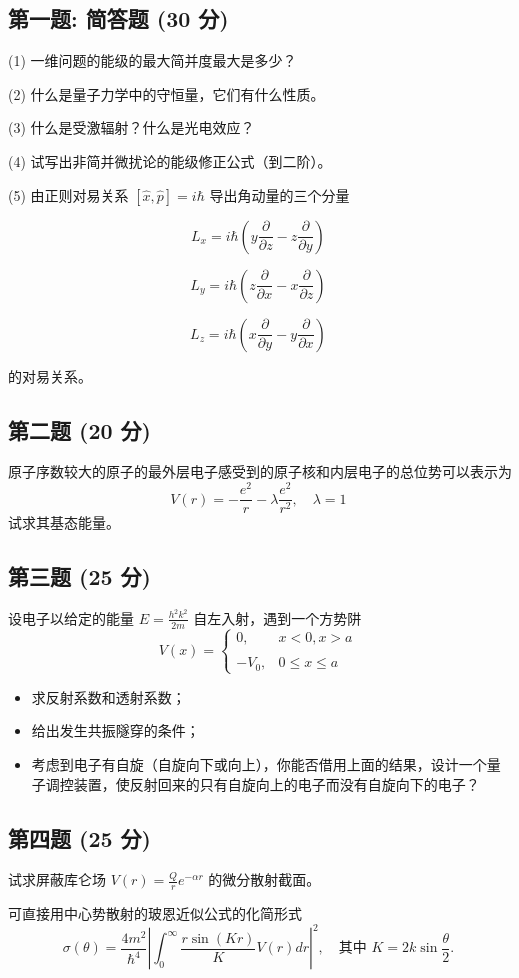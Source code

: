 

\subsection{第一题: 简答题 (30 分)}

(1) 一维问题的能级的最大简并度最大是多少？

(2) 什么是量子力学中的守恒量，它们有什么性质。

(3) 什么是受激辐射？什么是光电效应？

(4) 试写出非简并微扰论的能级修正公式（到二阶）。

(5) 由正则对易关系 $[\hat{x}, \hat{p}] = i\hbar$ 导出角动量的三个分量

\[L_x = i \hbar \left( y \frac{\partial}{\partial z} - z \frac{\partial}{\partial y} \right)~\]

\[L_y = i \hbar \left( z \frac{\partial}{\partial x} - x \frac{\partial}{\partial z} \right)~\]

\[L_z = i \hbar \left( x \frac{\partial}{\partial y} - y \frac{\partial}{\partial x} \right)~\]

的对易关系。
\subsection{第二题 (20 分)}
原子序数较大的原子的最外层电子感受到的原子核和内层电子的总位势可以表示为
\[V(r) = -\frac{e^2}{r} - \lambda \frac{e^2}{r^2}, \quad \lambda = 1~\]
试求其基态能量。
\subsection{第三题 (25 分)}
设电子以给定的能量 $E = \frac{h^2 k^2}{2m}$ 自左入射，遇到一个方势阱
\[V(x) = \begin{cases} 0, & x < 0, x > a \\\\-V_0, & 0 \leq x \leq a \end{cases}~\]
\begin{itemize}
  \item 求反射系数和透射系数；
  \item 给出发生共振隧穿的条件；
  \item 考虑到电子有自旋（自旋向下或向上），你能否借用上面的结果，设计一个量子调控装置，使反射回来的只有自旋向上的电子而没有自旋向下的电子？
\end{itemize}
\subsection{第四题 (25 分)}
试求屏蔽库仑场 $V(r) = \frac{Q}{r}e^{-\alpha r}$ 的微分散射截面。

 可直接用中心势散射的玻恩近似公式的化简形式
\[\sigma(\theta) = \frac{4m^2}{\hbar^4} \left| \int_0^\infty \frac{r \sin(Kr)}{K} V(r) dr \right|^2, \quad \text{其中 } K = 2k \sin\frac{\theta}{2}.~\]

